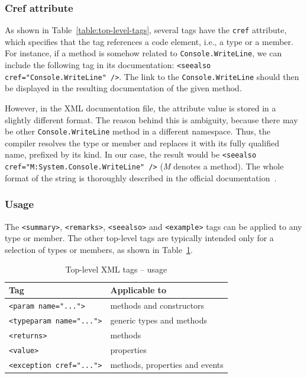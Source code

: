 \subsubsection*{Cref attribute}
As shown in Table~\ref{table:top-level-tags}, several tags have the \texttt{cref} attribute, which specifies that the tag references a code element, i.e., a type or a member.
For instance, if a method is somehow related to \texttt{Console.WriteLine}, we can include the following tag in its documentation: \texttt{<seealso cref="Console.WriteLine" />}.
The link to the \texttt{Console.WriteLine} should then be displayed in the resulting documentation of the given method.

However, in the XML documentation file, the attribute value is stored in a slightly different format.
The reason behind this is ambiguity, because there may be other \texttt{Console.WriteLine} method in a different namespace.
Thus, the compiler resolves the type or member and replaces it with its fully qualified name, prefixed by its kind.
In our case, the result would be 
\texttt{<seealso cref="M:System.Console.WriteLine" />} (\textit{M} denotes a method).
The whole format of the string is thoroughly described in the official documentation~\cite{csharp_xml_docs}.

\subsubsection*{Usage}

The \texttt{<summary>}, \texttt{<remarks>}, \texttt{<seealso>} and \texttt{<example>} tags can be applied to any type or member.
The other top-level tags are typically intended only for a selection of types or members, as shown in Table~\ref{table:top-level-tags-usage}.

\begin{table}[ht]
\centering
\begin{tabular}{|p{6cm}|p{6cm}|}
\hline
\textbf{Tag} & \textbf{Applicable to} \\
\hline
\texttt{<param name="...">} & methods and constructors \\
\hline
\texttt{<typeparam name="...">} & generic types and methods \\
\hline
\texttt{<returns>} & methods \\
\hline
\texttt{<value>} & properties \\
\hline
\texttt{<exception cref="...">} & methods, properties and events \\
\hline
\end{tabular}
\caption{Top-level XML tags -- usage}
\label{table:top-level-tags-usage}
\end{table}


